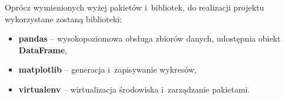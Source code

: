 Oprócz wymienionych wyżej pakietów i~bibliotek, do realizacji projektu wykorzystane zostaną biblioteki:
\begin{itemize}
    \item \textbf{pandas} -- wysokopoziomowa obsługa zbiorów danych, udostępnia obiekt \textbf{DataFrame},
    \item \textbf{matplotlib} -- generacja i~zapisywanie wykresów,
    \item \textbf{virtualenv} -- wirtualizacja środowiska i~zarządzanie pakietami.
\end{itemize}